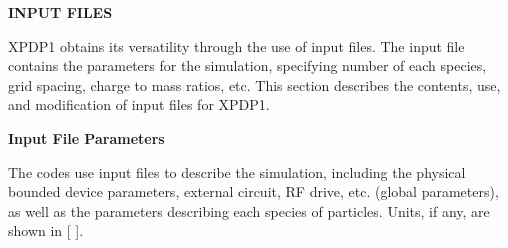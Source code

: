 \newpage
\begin{section}		%
{\bf INPUT FILES}

XPDP1 obtains its versatility through the use of input files.  The input file
contains the parameters for the simulation, specifying number of each species,
grid spacing, charge to mass ratios, etc.  This section describes the contents,
use, and modification of input files for XPDP1.

\begin{subsection}	%
{\bf Input File Parameters}

   The codes use input files to describe the simulation, including the physical
   bounded device parameters, external circuit, RF drive, etc. (global
   parameters), as well as the parameters describing each species of
   particles.  Units, if any, are shown in [ ].


\end{subsection}
\end{section}
